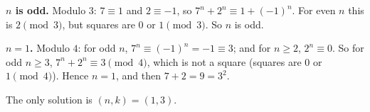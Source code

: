\textbf{$n$ is odd.} Modulo $3$: $7\equiv1$ and $2\equiv-1$, so $7^n+2^n\equiv1+(-1)^n$. For even $n$ this is $2\pmod3$, but squares are $0$ or $1\pmod3$. So $n$ is odd.

\textbf{$n=1$.} Modulo $4$: for odd $n$, $7^n\equiv(-1)^n=-1\equiv3$; and for $n\ge2$, $2^n\equiv0$. So for odd $n\ge3$, $7^n+2^n\equiv3\pmod4$, which is not a square (squares are $0$ or $1\pmod 4$). Hence $n=1$, and then $7+2=9=3^2$.

The only solution is $\boxed{(n,k)=(1,3)}$.
